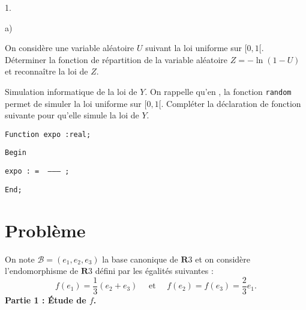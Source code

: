 \documentclass[11pt]{article}%
\begin{document}
\begin{noliste}{1.}
\begin{noliste}{a)}
\item On considère une variable aléatoire $U$ suivant la loi uniforme
sur $[0,1[$. Déterminer la fonction de répartition de la variable
aléatoire $Z = -\ln (1-U)$ et reconnaître la loi de $Z$.

\item Simulation informatique de la loi de $Y$. On rappelle qu'en 
\Scilab{}, la fonction \texttt{random} permet de simuler la loi
uniforme sur $[0,1[$. Compléter la déclaration de fonction suivante
pour qu'elle simule la
loi de $Y$.

\texttt{Function\ expo :real;}

\texttt{Begin}

\texttt{\hspace*{1cm}expo : = \ ---------\ ;}

\texttt{End;}
\end{noliste}
\end{noliste}

\section*{Problème}

On note $\mathcal{B} = (e_{1},e_{2},e_{3})$ la base canonique de
${\mathbf{R}}{3}$ et on considère l'endomorphisme de ${\mathbf{R}}{3}$
défini par les égalités suivantes : 
\[
f(e_{1}) = \dfrac{1}{3}(e_{2} + e_{3})\quad \text{ et }\quad f(e_{2}) =
f(e_{3}) = \dfrac{2}{3}e_{1}.
\]
\textbf{Partie 1 : Étude de $f$.}
\end{document}
